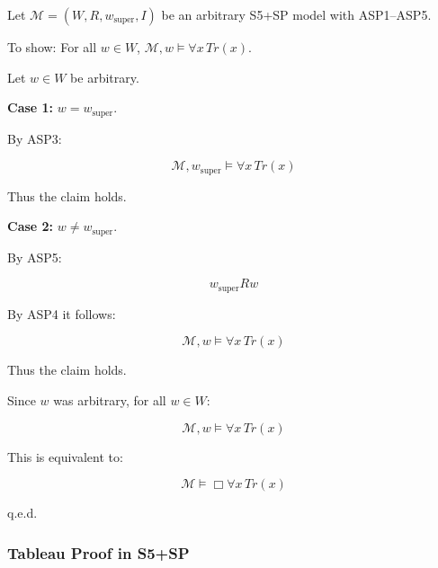 \documentclass[
]{article}
\begin{document}
Let \(\mathcal{M} = (W, R, w_{\text{super}}, I)\) be an arbitrary S5+SP model with ASP1–ASP5.

To show: For all \(w \in W\), \(\mathcal{M}, w \models \forall x\,Tr(x)\).

Let \(w \in W\) be arbitrary.

\textbf{Case 1:} \(w = w_{\text{super}}\).

By ASP3:

\[
\mathcal{M}, w_{\text{super}} \models \forall x\,Tr(x)
\]

Thus the claim holds.

\textbf{Case 2:} \(w \neq w_{\text{super}}\).

By ASP5:

\[
w_{\text{super}} R w
\]

By ASP4 it follows:

\[
\mathcal{M}, w \models \forall x\,Tr(x)
\]

Thus the claim holds.

Since \(w\) was arbitrary, for all \(w \in W\):

\[
\mathcal{M}, w \models \forall x\,Tr(x)
\]

This is equivalent to:

\[
\mathcal{M} \models \Box\forall x\,Tr(x)
\]

q.e.d.

\subsubsection{Tableau Proof in S5+SP}
\end{document}
